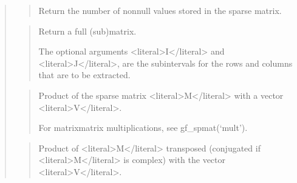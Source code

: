 \documentclass[a4paper,11pt,english]{sphinxmanual}
\begin{document}
\sphinxAtStartPar
{}
\begin{quote}

\sphinxAtStartPar
{}
\begin{quote}

\sphinxAtStartPar
Return the number of non\sphinxhyphen{}null values stored in the sparse matrix.
\end{quote}

\sphinxAtStartPar
{}
\begin{quote}

\sphinxAtStartPar
Return a full (sub\sphinxhyphen{})matrix.

\sphinxAtStartPar
The optional arguments \textless{}literal\textgreater{}I\textless{}/literal\textgreater{} and \textless{}literal\textgreater{}J\textless{}/literal\textgreater{}, are the sub\sphinxhyphen{}intervals for the
rows and columns that are to be extracted.
\end{quote}

\sphinxAtStartPar
{}
\begin{quote}

\sphinxAtStartPar
Product of the sparse matrix \textless{}literal\textgreater{}M\textless{}/literal\textgreater{} with a vector \textless{}literal\textgreater{}V\textless{}/literal\textgreater{}.

\sphinxAtStartPar
For matrix\sphinxhyphen{}matrix multiplications, see gf\_spmat(‘mult’).
\end{quote}

\sphinxAtStartPar
{}
\begin{quote}

\sphinxAtStartPar
Product of \textless{}literal\textgreater{}M\textless{}/literal\textgreater{} transposed (conjugated if \textless{}literal\textgreater{}M\textless{}/literal\textgreater{} is complex) with the
vector \textless{}literal\textgreater{}V\textless{}/literal\textgreater{}.
\end{quote}

\sphinxAtStartPar
{}
\begin{quote}


\end{quote}
\end{quote}
\end{document}
